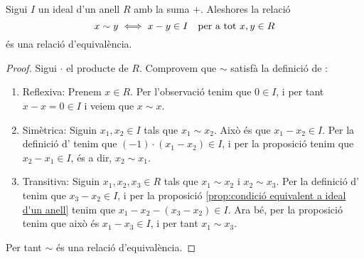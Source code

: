 \documentclass[../Apunts.tex]{subfiles}
\begin{document}
	\begin{proposition}
		\label{prop:relació d'equivalència en anells per ideals}
		Sigui \(I\) un ideal d'un anell \(R\) amb la suma \(+\). Aleshores la relació
		\[x\sim y\iff x-y\in I\quad\text{per a tot }x,y\in R\]
		és una relació d'equivalència.
		\begin{proof}
			Sigui \(\cdot\) el producte de \(R\). Comprovem que \(\sim\) satisfà la definició de :
			\begin{enumerate}
				\item Reflexiva: Prenem \(x\in R\). Per l'observació  tenim que \(0\in I\), i per tant \(x-x=0\in I\) i veiem que \(x\sim x\).
				\item Simètrica: Siguin \(x_{1},x_{2}\in I\) tals que \(x_{1}\sim x_{2}\). Això és que \(x_{1}-x_{2}\in I\). Per la definició d' tenim que \((-1)\cdot(x_{1}-x_{2})\in I\), i per la proposició  tenim que \(x_{2}-x_{1}\in I\), és a dir, \(x_{2}\sim x_{1}\).
				\item Transitiva: Siguin \(x_{1},x_{2},x_{3}\in R\) tals que \(x_{1}\sim x_{2}\) i \(x_{2}\sim x_{3}\). Per la definició d' tenim que \(x_{3}-x_{2}\in I\), i per la proposició \ref{prop:condició equivalent a ideal d'un anell} tenim que \(x_{1}-x_{2}-(x_{3}-x_{2})\in I\). Ara bé, per la proposició  tenim que això és \(x_{1}-x_{3}\in I\), i per tant \(x_{1}\sim x_{3}\).
			\end{enumerate}
			Per tant \(\sim\) és una relació d'equivalència.
		\end{proof}
	\end{proposition}
\end{document}
